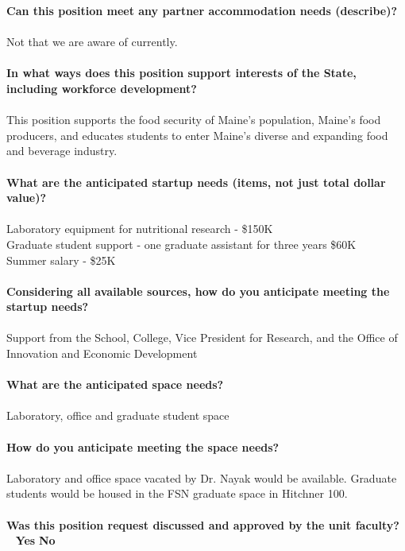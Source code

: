 \documentclass[11pt]{article}
\begin{document}
\vfill
\noindent\textbf{\rmfamily Can this position meet any partner accommodation needs (describe)?}
\\~\\Not that we are aware of currently.\\~\\
\vfill
\noindent\textbf{\rmfamily In what ways does this position support interests of the State, including workforce development?}\\~\\
This position supports the food security of Maine's population, Maine's food producers, and educates students to enter Maine's diverse and expanding food and beverage industry.
\\~\\
\vfill
\newpage\noindent\textbf{\rmfamily What are the anticipated startup needs (items, not just total dollar value)?}\\~\\
Laboratory equipment for nutritional research - \$150K \\
Graduate student support - one graduate assistant for three years \$60K\\
Summer salary - \$25K\\~\\
\vfill
\noindent\textbf{\rmfamily Considering all available sources, how do you anticipate meeting the startup needs?}\\~\\
Support from the School, College, Vice President for Research, and the Office of Innovation and Economic Development\\~\\
\vfill
\noindent\textbf{\rmfamily What are the anticipated space needs?}\\~\\ Laboratory, office and graduate student space\\~\\
\vfill
\noindent\textbf{\rmfamily How do you anticipate meeting the space needs?} \\~\\
Laboratory and office space vacated by Dr. Nayak would be available. Graduate students would be housed in the FSN graduate space in Hitchner 100.\\~\\
\vfill
\noindent\textbf{\rmfamily Was this position request discussed and approved by the unit faculty?} \hfill ~ \hfill \textbf{\Large{\CrossedBox} \normalsize{Yes}} \hfill \textbf{\Large{\HollowBox} \normalsize{ No}}\\~\\%
\end{document}
